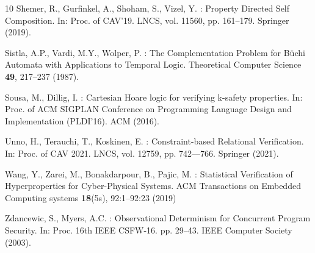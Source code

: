 \documentclass[10pt,a4paper]{article}
\begin{document}
\begin{thebibliography}{10}
	 Shemer, R., Gurfinkel, A., Shoham, S., Vizel, Y.
	: {Property Directed Self Composition}.
	In: Proc.
	of CAV'19.
	LNCS, vol.
	11560, pp. 161--179.
	Springer (2019).

	Sistla, A.P., Vardi, M.Y., Wolper, P.
	: {The Complementation Problem for {B}{\"u}chi Automata with Applications to Temporal Logic}.
	Theoretical Computer Science \textbf{49}, 217--237 (1987).

	Sousa, M., Dillig, I.
	: {Cartesian {H}oare logic for verifying k-safety properties}.
	In: Proc.
	of ACM SIGPLAN Conference on Programming Language Design and Implementation (PLDI'16).
	ACM (2016).

	Unno, H., Terauchi, T., Koskinen, E.
	: {Constraint-based Relational Verification}.
	In: Proc.
	of CAV 2021.
	LNCS, vol.
	12759, pp. 742–--766.
	Springer (2021).

	Wang, Y., Zarei, M., Bonakdarpour, B., Pajic, M.
	: {Statistical Verification of Hyperproperties for Cyber-Physical Systems}. {ACM}
	Transactions on Embedded Computing systems \textbf{18}(5s), 92:1--92:23 (2019)

	 Zdancewic, S., Myers, A.C.
	: {Observational Determinism for Concurrent Program Security}.
	In: Proc.
	16th {IEEE}
	CSFW-16.
	pp. 29--43. {IEEE}
	Computer Society (2003).

\end{thebibliography}
%
\end{document}
